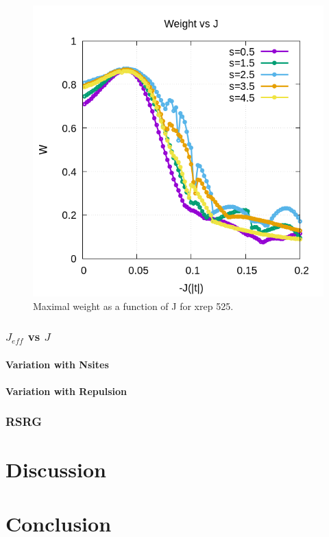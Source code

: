 \documentclass[ openright,titlepage,numbers=noenddot,headinclude,twoside,%
                footinclude=true,cleardoublepage=empty,abstractoff,%
                BCOR=5mm,paper=a4,fontsize=11pt,%
                ngerman,american,%
]{scrreprt}
\begin{document}
\begin{figure}[ht]
    \centering
    \includegraphics[scale=0.5]{Wmax_vs_J_xrep525.png}
    \caption{\label{fig:}Maximal weight as a function of J for xrep 525. }
\end{figure}

\subsection{$J_{eff}$ vs $J$}
\subsubsection{Variation with Nsites}
\subsubsection{Variation with Repulsion}

\subsection{RSRG}

\chapter{Discussion}

\chapter{Conclusion}
\end{document}
